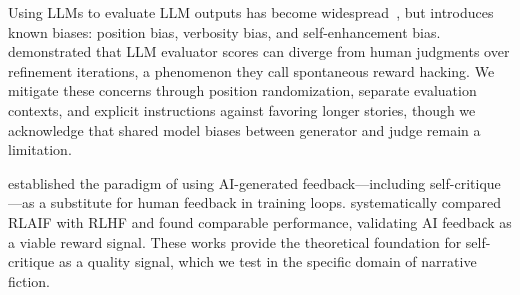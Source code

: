 Using LLMs to evaluate LLM outputs has become widespread~\citep{zheng2023judging}, but introduces known biases: position bias, verbosity bias, and self-enhancement bias.
\citet{pan2024rewardhacking} demonstrated that LLM evaluator scores can diverge from human judgments over refinement iterations, a phenomenon they call spontaneous reward hacking.
We mitigate these concerns through position randomization, separate evaluation contexts, and explicit instructions against favoring longer stories, though we acknowledge that shared model biases between generator and judge remain a limitation.

\citet{bai2022constitutional} established the paradigm of using AI-generated feedback---including self-critique---as a substitute for human feedback in training loops.
\citet{lee2023rlaif} systematically compared RLAIF with RLHF and found comparable performance, validating AI feedback as a viable reward signal.
These works provide the theoretical foundation for self-critique as a quality signal, which we test in the specific domain of narrative fiction.
